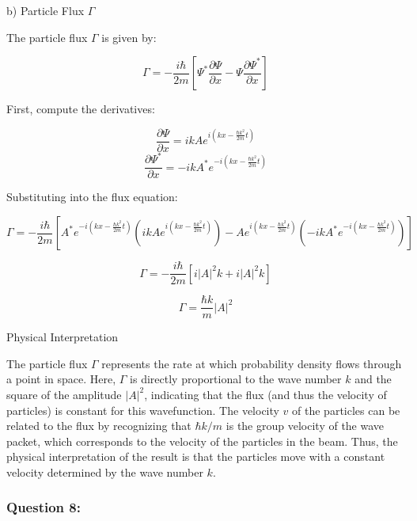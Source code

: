 \documentclass[a4paper,11pt]{article}
\begin{document}
b) Particle Flux \( \Gamma \)

The particle flux \( \Gamma \) is given by:

\[ \Gamma = -\frac{i\hbar}{2m}\left[ \Psi^{*}\frac{\partial\Psi}{\partial x} - \Psi\frac{\partial\Psi^{*}}{\partial x} \right] \]

First, compute the derivatives:

\[ \frac{\partial\Psi}{\partial x} = ikAe^{i(kx - \frac{\hbar k^2}{2m}t)} \]
\[ \frac{\partial\Psi^{*}}{\partial x} = -ikA^{*}e^{-i(kx - \frac{\hbar k^2}{2m}t)} \]

Substituting into the flux equation:

\[ \Gamma = -\frac{i\hbar}{2m}\left[ A^{*}e^{-i(kx - \frac{\hbar k^2}{2m}t)}(ikAe^{i(kx - \frac{\hbar k^2}{2m}t)}) - Ae^{i(kx - \frac{\hbar k^2}{2m}t)}(-ikA^{*}e^{-i(kx - \frac{\hbar k^2}{2m}t)}) \right] \]

\[ \Gamma = -\frac{i\hbar}{2m}\left[ i|A|^2k + i|A|^2k \right] \]

\[ \Gamma = \frac{\hbar k}{m}|A|^2 \]

Physical Interpretation

The particle flux \( \Gamma \) represents the rate at which probability density flows through a point in space. Here, \( \Gamma \) is directly proportional to the wave number \( k \) and the square of the amplitude \( |A|^2 \), indicating that the flux (and thus the velocity of particles) is constant for this wavefunction. The velocity \( v \) of the particles can be related to the flux by recognizing that \( \hbar k/m \) is the group velocity of the wave packet, which corresponds to the velocity of the particles in the beam. Thus, the physical interpretation of the result is that the particles move with a constant velocity determined by the wave number \( k \).


\subsubsection*{Question 8:}
\end{document}
